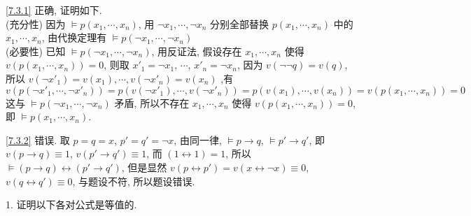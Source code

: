 \documentclass[boxes]{homework}
\begin{document}
\begin{solution}
    \ref{7.3.1} 正确, 证明如下.\\
    (充分性) 因为 $\vDash p(x_1, \cdots, x_n)$, 用 $\lnot x_1, \cdots, \lnot x_n$ 分别全部替换 $p(x_1, \cdots, x_n)$ 中的 $x_1, \cdots, x_n$, 由代换定理有 $\vDash p(\lnot x_1, \cdots, \lnot x_n)$\\
    (必要性) 已知 $\vDash p(\lnot x_1, \cdots, \lnot x_n)$, 用反证法, 假设存在 $x_1, \cdots, x_n$ 使得 $v(p(x_1, \cdots, x_n)) = 0$, 则取 $x'_1 = \lnot x_1$, $\cdots$, $x'_n = \lnot x_n$, 因为 $v(\lnot \lnot q) = v(q)$, 所以 $v(\lnot x'_1) = v(x_1), \cdots, v(\lnot x'_n) = v(x_n)$ ,有
    \begin{equation*}
        v(p(\lnot x'_1, \cdots, \lnot x'_n)) = p(v(\lnot x'_1), \cdots, v(\lnot x'_n)) = p(v(x_1), \cdots, v(x_n)) = v(p(x_1, \cdots, x_n)) = 0
    \end{equation*}
    这与 $\vDash p(\lnot x_1, \cdots, \lnot x_n)$ 矛盾, 所以不存在 $x_1, \cdots, x_n$ 使得 $v(p(x_1, \cdots, x_n)) = 0$, 即 $\vDash p(x_1, \cdots, x_n)$.

    \ref{7.3.2} 错误. 取 $p = q = x$, $p' = q' = \lnot x$, 由同一律, $\vDash p\to q$, $\vDash p'\to q'$, 即 $v(p\to q) \equiv 1$, $v(p'\to q') \equiv 1$, 而 $(1\leftrightarrow 1) = 1$, 所以 $\vDash (p\to q)\leftrightarrow(p'\to q')$, 但是显然 $v(p\leftrightarrow p')=v(x\leftrightarrow\lnot x) \equiv 0$, $v(q\leftrightarrow q') \equiv 0$, 与题设不符, 所以题设错误.
\end{solution}
\begin{problem}
1. 证明以下各对公式是等值的.
\end{problem}
\end{document}
